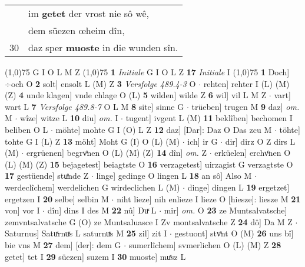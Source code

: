 \documentclass[8pt,a4paper,notitlepage]{article}
\begin{document}
\begin{table}[ht]
\begin{minipage}[t]{0.5\linewidth}
\begin{tabular}{rl}
 & im \textbf{getet} der vrost nie sô wê,\\ 
 & dem süezen œheim dîn,\\ 
30 & daz sper \textbf{muoste} in die wunden sîn.\\ 
\end{tabular}
\scriptsize
\line(1,0){75} \newline
G I O L M Z \newline
\line(1,0){75} \newline
\textbf{1} \textit{Initiale} G I O L Z  \textbf{17} \textit{Initiale} I  \newline
\line(1,0){75} \newline
\textbf{1} Doch] ÷och O \textbf{2} solt] ensolt L (M) Z \textbf{3} \textit{Versfolge 489.4-3} O   $\cdot$ rehten] rehter I (L) (M) (Z) \textbf{4} unde klagen] vnde chlage O (L) \textbf{5} wilden] wilde Z \textbf{6} wil] vil L M Z  $\cdot$ vart] wart L \textbf{7} \textit{Versfolge 489.8-7} O L M  \textbf{8} site] sinne G  $\cdot$ trüeben] trugen M \textbf{9} daz] \textit{om.} M  $\cdot$ wîze] witze L \textbf{10} diu] \textit{om.} I  $\cdot$ tugent] ivgent L (M) \textbf{11} beklîben] bechomen I beliben O L  $\cdot$ möhte] mohte G I (O) L Z \textbf{12} daz] [Dar]: Daz O Das zcu M  $\cdot$ töhte] tohte G I (L) Z \textbf{13} möht] Moht G (I) O (L) (M)  $\cdot$ ich] ir G  $\cdot$ dir] dirz O Z dirs L (M)  $\cdot$ ergrüenen] begrvͦnen O (L) (M) (Z) \textbf{14} dîn] \textit{om.} Z  $\cdot$ erküelen] erchvͦnen O (L) (M) (Z) \textbf{15} bejagetest] beiagtste O \textbf{16} verzagetest] uirzagist G verzagtste O \textbf{17} gestüende] stuͤnde Z  $\cdot$ linge] gedinge O lingen L \textbf{18} an sô] Also M  $\cdot$ werdeclîchem] werdelichen G wirdeclichen L (M)  $\cdot$ dinge] dingen L \textbf{19} ergetzet] ergetzen I \textbf{20} selbe] selbin M  $\cdot$ niht lieze] nih enlieze I lieze O [hiesze]: liesze M \textbf{21} von] vor I  $\cdot$ dîn] dins I des M \textbf{22} nû] Duͯ L  $\cdot$ mir] \textit{om.} O \textbf{23} ze Muntsalvatsche] zemvntsalvatsche G (O) ze Muntsaluasce I Zv montsalvatsche Z \textbf{24} dô] Da M Z  $\cdot$ Saturnus] Satuͯrnuͯs L saturnuͯs M \textbf{25} zil] zit I  $\cdot$ gestuont] stvͦnt O (M) \textbf{26} uns bî] bie vns M \textbf{27} dem] [der]: dem G  $\cdot$ sumerlîchem] svmerlichen O (L) (M) Z \textbf{28} getet] tet I \textbf{29} süezen] suzem I \textbf{30} muoste] muͯsz L \newline
\end{minipage}
\hspace{0.5cm}
\begin{minipage}[t]{0.5\linewidth}

\end{minipage}
\end{table}
\end{document}
